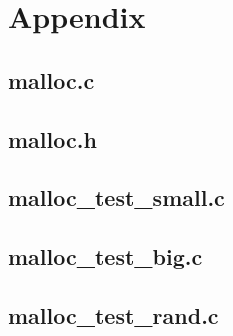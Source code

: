 \documentclass[paper=a4, fontsize=11pt]{scrartcl} %
\numberwithin{equation}{section} %
\numberwithin{figure}{section} %
\numberwithin{table}{section} %
\begin{document}
\newpage
\section*{Appendix}
\subsection*{malloc.c}


\newpage
\subsection*{malloc.h}


\newpage
\subsection*{malloc\_test\_small.c}


\newpage
\subsection*{malloc\_test\_big.c}


\newpage
\subsection*{malloc\_test\_rand.c}

\end{document}
